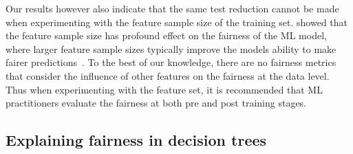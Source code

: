\documentclass{article}
\begin{document}


Our results however also indicate that the same test reduction cannot
be made when experimenting with the feature sample size of the
training set. \citeauthor{zhang2021ignorance} showed that the feature
sample size has profound effect on the fairness of the ML model, where
larger feature sample sizes typically improve the models ability to
make fairer predictions \cite{zhang2021ignorance}. To the best of our
knowledge, there are no fairness metrics that consider the influence
of other features on the fairness at the data level. Thus when
experimenting with the feature set, it is recommended that ML
practitioners evaluate the fairness at both pre and post training
stages.



\subsection{Explaining fairness in decision trees}\label{sec:discuss-explain-fair-dt}


\end{document}
